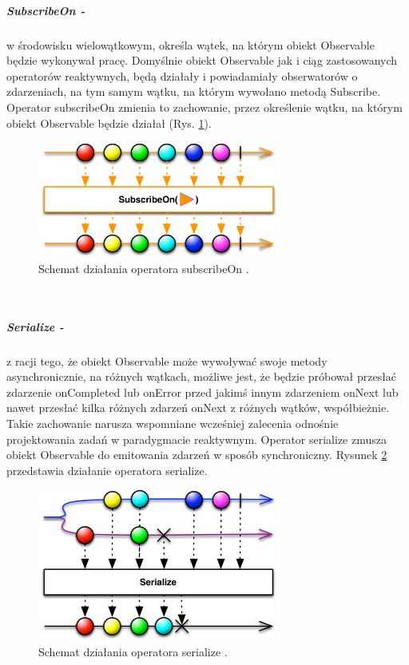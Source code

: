 \documentclass[12pt,oneside,a4paper]{report}
\begin{document}
\subparagraph{SubscribeOn -}w środowisku wielowątkowym, określa wątek, na którym obiekt Observable będzie wykonywał pracę. Domyślnie obiekt Observable jak i ciąg zastosowanych operatorów reaktywnych, będą działały i powiadamiały obserwatorów o zdarzeniach, na tym samym wątku, na którym wywołano metodą Subscribe. Operator subscribeOn zmienia to zachowanie, przez określenie wątku, na którym obiekt Observable będzie działał (Rys. \ref{subscribeOn}). 
\begin{figure}[ht!]
	\centering
	\includegraphics[width=8cm]{subscribeOn}
	\caption{Schemat działania operatora subscribeOn \cite{operators}.}
	\label{subscribeOn}
\end{figure}\\

\subparagraph{Serialize -}z racji tego, że obiekt Observable może wywoływać swoje metody asynchronicznie, na różnych wątkach, możliwe jest, że będzie próbował przesłać zdarzenie onCompleted lub onError przed jakimś innym zdarzeniem onNext lub nawet przesłać kilka różnych zdarzeń onNext z różnych wątków, współbieżnie. Takie zachowanie narusza wspomniane wcześniej zalecenia odnośnie projektowania zadań w paradygmacie reaktywnym. Operator serialize zmusza obiekt Observable do emitowania zdarzeń w sposób synchroniczny. Rysunek \ref{serialize} przedstawia działanie operatora serialize.
\begin{figure}[ht!]
	\centering
	\includegraphics[width=8cm]{serialize}
	\caption{Schemat działania operatora serialize \cite{operators}.}
	\label{serialize}
\end{figure}\\
\end{document}
